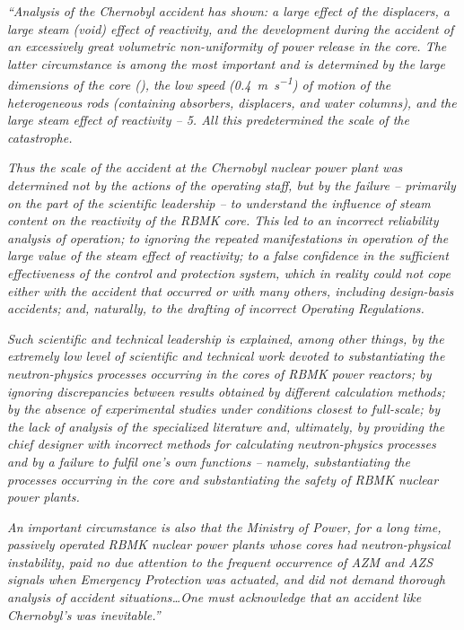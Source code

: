\documentclass[openright]{bookest}
\begin{document}
\begin{personal}
\textit{``Analysis of the Chernobyl accident has shown: a large effect of the displacers, a large steam (void) effect of reactivity, and the development during the accident of an excessively great volumetric non-uniformity of power release in the core. The latter circumstance is among the most important and is determined by the large dimensions of the core (), the low speed (\qty{0.4}{\metre\per\second}) of motion of the heterogeneous rods (containing absorbers, displacers, and water columns), and the large steam effect of reactivity -- \qty{5}{\betaeff}. All this predetermined the scale of the catastrophe.}

\textit{Thus the scale of the accident at the Chernobyl nuclear power plant was determined not by the actions of the operating staff, but by the failure -- primarily on the part of the scientific leadership -- to understand the influence of steam content on the reactivity of the RBMK core. This led to an incorrect reliability analysis of operation; to ignoring the repeated manifestations in operation of the large value of the steam effect of reactivity; to a false confidence in the sufficient effectiveness of the control and protection system, which in reality could not cope either with the accident that occurred or with many others, including design-basis accidents; and, naturally, to the drafting of incorrect Operating Regulations.}

\textit{Such scientific and technical leadership is explained, among other things, by the extremely low level of scientific and technical work devoted to substantiating the neutron-physics processes occurring in the cores of RBMK power reactors; by ignoring discrepancies between results obtained by different calculation methods; by the absence of experimental studies under conditions closest to full-scale; by the lack of analysis of the specialized literature and, ultimately, by providing the chief designer with incorrect methods for calculating neutron-physics processes and by a failure to fulfil one's own functions -- namely, substantiating the processes occurring in the core and substantiating the safety of RBMK nuclear power plants.}

\textit{An important circumstance is also that the Ministry of Power, for a long time, passively operated RBMK nuclear power plants whose cores had neutron-physical instability, paid no due attention to the frequent occurrence of AZM and AZS signals when Emergency Protection was actuated, and did not demand thorough analysis of accident situations\ldots One must acknowledge that an accident like Chernobyl's was inevitable.''}
\end{personal}
\end{document}

